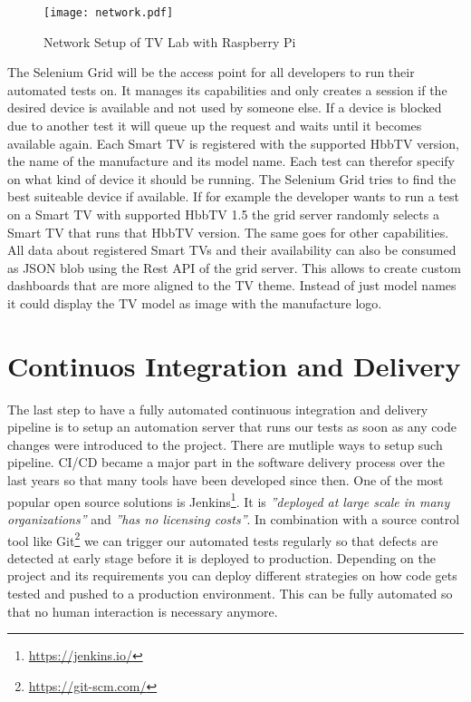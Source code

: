 \vspace{1cm}
\begin{figure}[htb]
  \centering
  \texttt{[image: network.pdf]}\\
  \caption{Network Setup of TV Lab with Raspberry Pi}\label{fig:network}
\end{figure}
\vspace{0.5cm}

The Selenium Grid will be the access point for all developers to run their automated tests on. It
manages its capabilities and only creates a session if the desired device is available and not used
by someone else. If a device is blocked due to another test it will queue up the request and waits
until it becomes available again. Each Smart TV is registered with the supported HbbTV version, the
name of the manufacture and its model name. Each test can therefor specify on what kind of device
it should be running. The Selenium Grid tries to find the best suiteable device if available. If for
example the developer wants to run a test on a Smart TV with supported HbbTV 1.5 the grid server
randomly selects a Smart TV that runs that HbbTV version. The same goes for other capabilities. All
data about registered Smart TVs and their availability can also be consumed as JSON blob using
the Rest API of the grid server. This allows to create custom dashboards that are more aligned to
the TV theme. Instead of just model names it could display the TV model as image with the manufacture
logo.

\section{Continuos Integration and Delivery\label{sec:cicd}}

The last step to have a fully automated continuous integration and delivery pipeline is to setup
an automation server that runs our tests as soon as any code changes were introduced to the project.
There are mutliple ways to setup such pipeline. CI/CD became a major part in the software delivery
process over the last years so that many tools have been developed since then. One of the most
popular open source solutions is Jenkins\footnote{\url{https://jenkins.io/}}. It is \textit{''deployed
at large scale in many organizations''}\cite{jenkins} and \textit{''has no licensing costs''}\cite{jenkins}.
In combination with a source control tool like Git\footnote{\url{https://git-scm.com/}} we can
trigger our automated tests regularly so that defects are detected at early stage before it is
deployed to production. Depending on the project and its requirements you can deploy different
strategies on how code gets tested and pushed to a production environment. This can be fully automated
so that no human interaction is necessary anymore.

